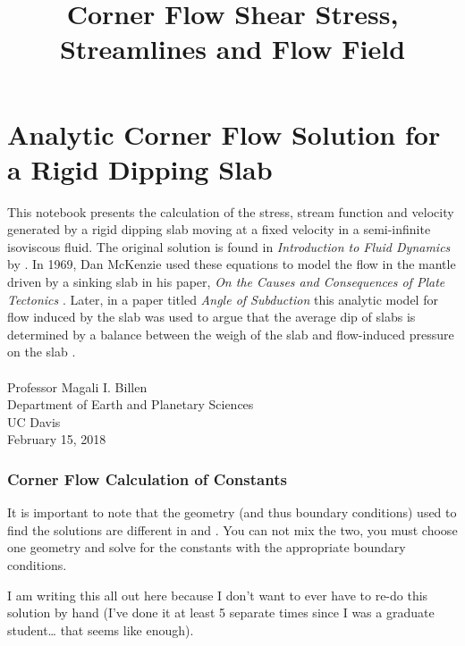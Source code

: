 \documentclass[11pt]{article}
\title{Corner Flow Shear Stress, Streamlines and Flow Field}
\begin{document}
    
    
    \maketitle
    
    

    
    \hypertarget{analytic-corner-flow-solution-for-a-rigid-dipping-slab}{%
\section{Analytic Corner Flow Solution for a Rigid Dipping
Slab}\label{analytic-corner-flow-solution-for-a-rigid-dipping-slab}}

This notebook presents the calculation of the stress, stream function
and velocity generated by a rigid dipping slab moving at a fixed
velocity in a semi-infinite isoviscous fluid. The original solution is
found in \textit{Introduction to Fluid Dynamics} by \citet{batchelor_book67}. In 1969,
Dan McKenzie used these equations to model the flow in the mantle driven
by a sinking slab in his paper, \textit{On the Causes and Consequences of Plate
Tectonics} \citep{mckenzie_gjras69}. Later, in a paper titled \textit{Angle of Subduction} this analytic
model for flow induced by the slab was used to argue that the average
dip of slabs is determined by a balance between the weigh of the slab
and flow-induced pressure on the slab \citep{stevenson_turner_nature77}.\\
\ \\
\noindent Professor Magali I. Billen\\
Department of Earth and Planetary Sciences\\
UC Davis \\
February 15, 2018

    \hypertarget{corner-flow-calculation-of-constants}{%
\subsubsection{Corner Flow Calculation of
Constants}\label{corner-flow-calculation-of-constants}}

It is important to note that the geometry (and thus boundary conditions)
used to find the solutions are different in \citet{batchelor_book67} and
\citet{mckenzie_gjras69}. You can not mix the two, you must choose one geometry
and solve for the constants with the appropriate boundary conditions.

I am writing this all out here because I don't want to ever have to
re-do this solution by hand (I've done it at least 5 separate times
since I was a graduate student\ldots{} that seems like enough).
\end{document}

